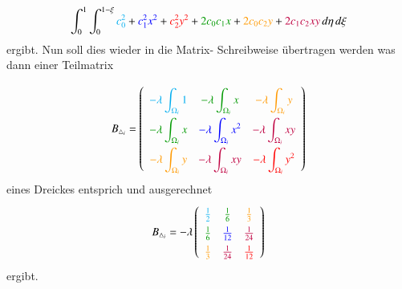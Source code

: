 \begin{equation}
			\int_0^1 \int_0^{1 - \xi}  \textcolor{cyan}{c_0^2} + \textcolor{blue}{c_1^2 x^2} + \textcolor{red}{c_2^2 y^2} + \textcolor{darkgreen}{2 c_0 c_1 x} + \textcolor{orange}{2 c_0 c_2 y} +\textcolor{purple}{ 2 c_1 c_2 xy} \,  d\eta \, d \xi
			\label{fem:Minimal2LinAlgB}
\end{equation}
ergibt.
Nun soll dies wieder in die Matrix- Schreibweise übertragen werden was dann einer Teilmatrix

\begin{equation}
\renewcommand\arraystretch{2}
B_{\triangle_i}
=
\left( \begin{array}{ccc}
\displaystyle\color{cyan}{- \lambda \int_{\Omega_i} 1}
	&  \displaystyle\color{darkgreen}{- \lambda \int_{\Omega_i} x}
		& \displaystyle\color{orange}{- \lambda \int_{\Omega_i} y}
\\
\displaystyle\color{darkgreen}{- \lambda \int_{\Omega_i}x}
	& \displaystyle\color{blue}{- \lambda \int_{\Omega_i} x^2}
		&  \displaystyle\color{purple}{- \lambda \int_{\Omega_i} xy}
\\
\displaystyle\color{orange}{- \lambda \int_{\Omega_i} y}
	& \displaystyle\color{purple}{- \lambda \int_{\Omega_i} xy}
		& \displaystyle\color{red}{ - \lambda \int_{\Omega_i} y^2} \\
\end{array}\right)
\label{fem:MatrixB}
\end{equation}
eines Dreickes entsprich und ausgerechnet
\begin{equation}
\renewcommand\arraystretch{1.4}
 B_{\triangle_i} = - \lambda \left( \begin{array}{ccc}
	\textcolor{cyan}{ \frac{1}{2}} &  \textcolor{darkgreen}{ \frac{1}{6}}& \textcolor{orange}{\frac{1}{3}}  \\
	\textcolor{darkgreen}{\frac{1}{6}} & \textcolor{blue}{\frac{1}{12}} &  \textcolor{purple}{ \frac{1}{24}} \\
	\textcolor{orange}{\frac{1}{3}} & \textcolor{purple}{\frac{1}{24}} & \textcolor{red}{ \frac{1}{12}} \\
	\end{array}\right) 
	\label{fem:MatrixB}
\end{equation}
ergibt.

